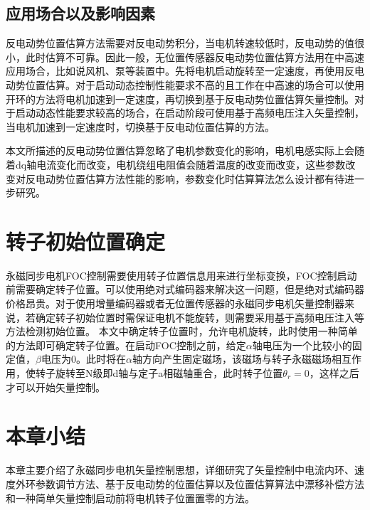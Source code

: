 \subsection{应用场合以及影响因素}
反电动势位置估算方法需要对反电动势积分，当电机转速较低时，反电动势的值很小，此时估算不可靠。因此一般，无位置传感器反电动势位置估算方法用在中高速应用场合，比如说风机、泵等装置中。先将电机启动旋转至一定速度，再使用反电动势位置估算。对于启动动态控制性能要求不高的且工作在中高速的场合可以使用开环的方法将电机加速到一定速度，再切换到基于反电动势位置估算矢量控制\cite{wang2012simple}。对于启动动态性能要求较高的场合，在启动阶段可使用基于高频电压注入矢量控制，当电机加速到一定速度时，切换基于反电动位置估算的方法\cite{1348530}。

本文所描述的反电动势位置估算忽略了电机参数变化的影响，电机电感实际上会随着dq轴电流变化而改变\cite{lu2013artificial}，电机绕组电阻值会随着温度的改变而改变，这些参数改变对反电动势位置估算方法性能的影响，参数变化时估算算法怎么设计都有待进一步研究。
\section{转子初始位置确定}
永磁同步电机FOC控制需要使用转子位置信息用来进行坐标变换，FOC控制启动前需要确定转子位置。可以使用绝对式编码器来解决这一问题，但是绝对式编码器价格昂贵。对于使用增量编码器或者无位置传感器的永磁同步电机矢量控制器来说，若确定转子初始位置时需保证电机不能旋转，则需要采用基于高频电压注入等方法检测初始位置\cite{__2013,bolognani_sensorless_1999,__2011-1,__2011}。
本文中确定转子位置时，允许电机旋转，此时使用一种简单的方法即可确定转子位置。在启动FOC控制之前，给定$\alpha$轴电压为一个比较小的固定值，$\beta$电压为0。此时将在$\alpha$轴方向产生固定磁场，该磁场与转子永磁磁场相互作用，使转子旋转至N级即d轴与定子a相磁轴重合，此时转子位置$\theta_{r}=0$，这样之后才可以开始矢量控制。
\section{本章小结}
本章主要介绍了永磁同步电机矢量控制思想，详细研究了矢量控制中电流内环、速度外环参数调节方法、基于反电动势的位置估算以及位置估算算法中漂移补偿方法和一种简单矢量控制启动前将电机转子位置置零的方法。